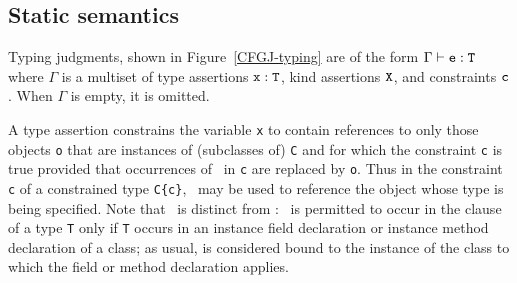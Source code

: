 \subsection{Static semantics}

Typing judgments, shown in Figure~\ref{CFGJ-typing}
are of the form $\Gamma \vdash \TY{\tt T}{\tt e}$
where $\Gamma$ is a multiset of type assertions $\TY{\tt T}{\tt x}$,
kind assertions ${\tt X}$,
and constraints ${\tt c}$.
When $\Gamma$ is empty, it is
omitted. 

A type assertion  constrains the variable {\tt x} to
contain references to only those objects {\tt o} that are instances of
(subclasses of) {\tt C} and for which the constraint {\tt c} is true
provided that occurrences of \self\ in {\tt c} are replaced by
{\tt o}. Thus in the constraint {\tt c} of a constrained type
{\tt C\{c\}}, \self\ may be used to reference the object whose type is
being specified. Note that \self\ is distinct from
\this: \this\ is permitted to occur in the clause of
a type {\tt T} only
if {\tt T} occurs in an instance field declaration or instance method
declaration of a class; as usual, \this{} is considered bound to the
instance of the class to which the field or method declaration
applies.

\renewcommand\andalso\quad

